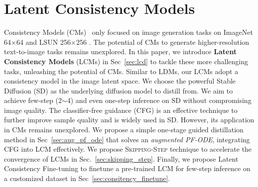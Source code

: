 \documentclass{article} %
\begin{document}



\vspace{-10pt}
\section{Latent Consistency Models}
\vspace{-5pt}

Consistency Models (CMs)~\citep{song2023consistency} only focused on image generation tasks on ImageNet 64$\times$64 \citep{deng2009imagenet} and LSUN 256$\times$256 \citep{yu2015lsun}. The potential of CMs to generate higher-resolution text-to-image tasks remains unexplored. In this paper, we introduce \textbf{Latent Consistency Models} (LCMs) in Sec~\ref{sec:lcd} to tackle these more challenging tasks, unleashing the potential of CMs. Similar to LDMs, our LCMs adopt a consistency model in the image latent space. We choose the powerful Stable Diffusion (SD) as the underlying diffusion model to distill from. 
We aim to achieve few-step (2$\sim$4) and even one-step inference on SD without compromising image quality. The classifier-free guidance (CFG) \citep{ho2022classifier} is an effective technique to further improve sample quality and is widely used in SD. However, its application in CMs remains unexplored. We propose a simple one-stage guided distillation method in Sec~\ref{sec:aug_pf_ode} that solves an {\em augmented PF-ODE}, integrating CFG into LCM effectively. We propose \textsc{Skipping-Step} technique to accelerate the convergence of LCMs in Sec.~\ref{sec:skipping_step}. Finally, we propose Latent Consistency Fine-tuning to finetune a pre-trained LCM for few-step inference on a customized dataset in Sec~\ref{sec:consitency_finetune}. 
\end{document}
